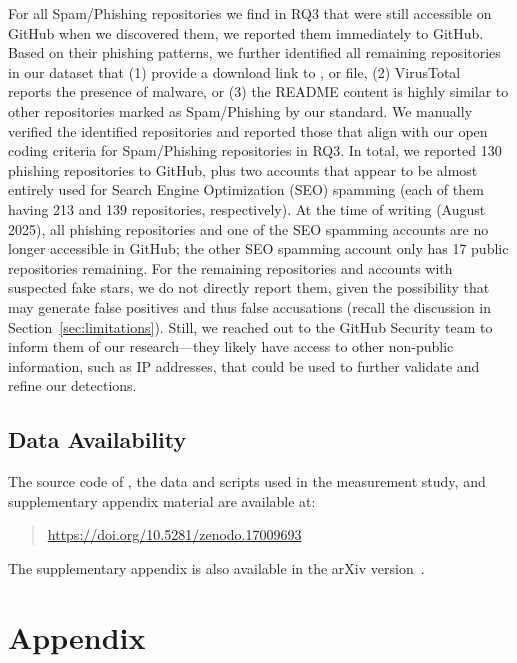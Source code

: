 For all \textsf{Spam/Phishing} repositories we find in RQ3 that were still accessible on GitHub when we discovered them, we reported them immediately to GitHub.
Based on their phishing patterns, we further identified all remaining repositories in our dataset that (1) provide a download link to ,  or  file, (2) VirusTotal~\cite{virus-total} reports the presence of malware, or (3) the README content is highly similar to other repositories marked as \textsf{Spam/Phishing} by our standard.
We manually verified the identified repositories and reported those that align with our open coding criteria for \textsf{Spam/Phishing} repositories in RQ3.
In total, we reported 130 phishing repositories to GitHub, plus two accounts that appear to be almost entirely used for Search Engine Optimization (SEO) spamming (each of them having 213 and 139 repositories, respectively).
At the time of writing (August 2025), all phishing repositories and one of the SEO spamming accounts are no longer accessible in GitHub; the other SEO spamming account only has 17 public repositories remaining.
For the remaining repositories and accounts with suspected fake stars, we do not directly report them, given the possibility that \SystemName may generate false positives and thus false accusations (recall the discussion in Section~\ref{sec:limitations}).
Still, we reached out to the GitHub Security team to inform them of our research---they likely have access to other non-public information, such as IP addresses, that could be used to further validate and refine our detections.

\subsection*{Data Availability}
\label{sec:data-avail}
\label{sec:conclusion}

The source code of \SystemName, the data and scripts used in the measurement study, and supplementary appendix material are available at:
\begin{quote}
\centering
\url{https://doi.org/10.5281/zenodo.17009693}
\end{quote}
The supplementary appendix is also available in the arXiv version~\cite{DBLP:journals/corr/abs-2412-13459}.

\section{Appendix}
\label{sec:fake-stars-appendix}

